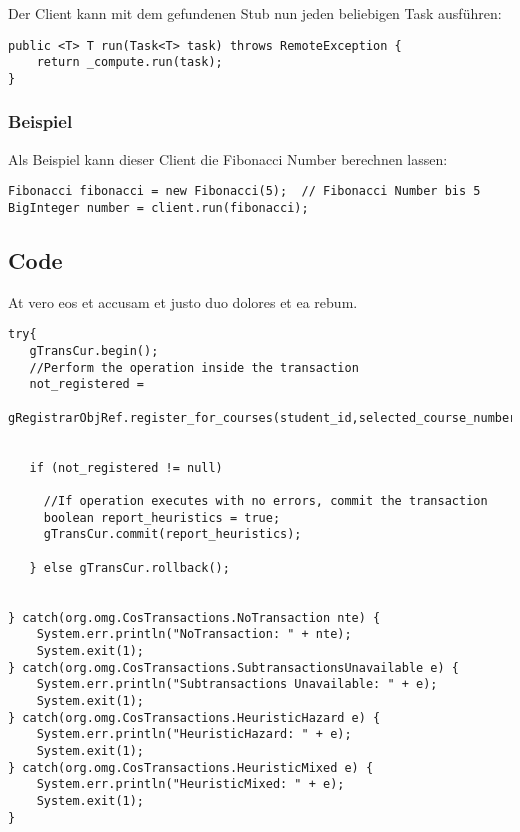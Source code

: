 Der Client kann mit dem gefundenen Stub nun jeden beliebigen Task ausführen:

\begin{lstlisting}[style=Java, caption=Client Implementation - Task run]
public <T> T run(Task<T> task) throws RemoteException {
    return _compute.run(task);
}
\end{lstlisting}

\subsubsection{Beispiel}

Als Beispiel kann dieser Client die Fibonacci Number berechnen lassen:

\begin{lstlisting}[style=Java, caption=Client Implementation - Fibonacci Beispiel]
Fibonacci fibonacci = new Fibonacci(5);  // Fibonacci Number bis 5
BigInteger number = client.run(fibonacci);
\end{lstlisting}

\subsection{Code}

At vero eos et accusam et justo duo dolores et ea rebum.

\begin{lstlisting}[style=Java, caption=Implizite Transaktion \cite{tanenbaum2007verteilte}]
try{
   gTransCur.begin();
   //Perform the operation inside the transaction
   not_registered = 
       gRegistrarObjRef.register_for_courses(student_id,selected_course_numbers);


   if (not_registered != null)

     //If operation executes with no errors, commit the transaction
     boolean report_heuristics = true;
     gTransCur.commit(report_heuristics);

   } else gTransCur.rollback();


} catch(org.omg.CosTransactions.NoTransaction nte) {
    System.err.println("NoTransaction: " + nte);
    System.exit(1);
} catch(org.omg.CosTransactions.SubtransactionsUnavailable e) {
    System.err.println("Subtransactions Unavailable: " + e);
    System.exit(1);
} catch(org.omg.CosTransactions.HeuristicHazard e) {
    System.err.println("HeuristicHazard: " + e);
    System.exit(1);
} catch(org.omg.CosTransactions.HeuristicMixed e) {
    System.err.println("HeuristicMixed: " + e);
    System.exit(1);
}
\end{lstlisting}


